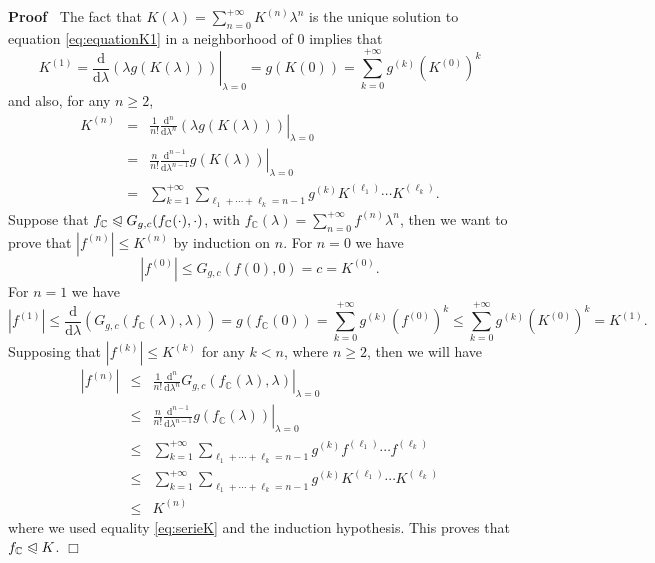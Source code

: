 \documentclass{article}
\newcommand{\mathd}{\mathrm{d}}
\newenvironment{proof}{\noindent\textbf{Proof\ }}{\hspace*{\fill}$\Box$\medskip}
\begin{document}
\begin{proof}
  The fact that $K (\lambda) = \sum_{n = 0}^{+ \infty} K^{(n)} \lambda^n$ is
  the unique solution to equation {\eqref{eq:equationK1}} in a neighborhood of
  $0$ implies that
  \[ K^{(1)} = \left. \left. \frac{\mathd}{\mathd \lambda} (\lambda g (K
     (\lambda))) \right| \right._{\lambda = 0} = g (K (0)) = \sum_{k = 0}^{+
     \infty} g^{(k)} (K^{(0)})^k \]
  and also, for any $n \geqslant 2$,
  \begin{eqnarray}
    K^{(n)} & = & \frac{1}{n!} \left. \left. \frac{\mathd^n}{\mathd \lambda^n}
    (\lambda g (K (\lambda))) \right| \right._{\lambda = 0} \nonumber\\
    & = & \frac{n}{n!} \left. \left. \frac{\mathd^{n - 1}}{\mathd \lambda^{n
    - 1}} g (K (\lambda)) \right| \right._{\lambda = 0} \nonumber\\
    & = & \sum_{k = 1}^{+ \infty} \sum_{\ell_1 + \cdots + \ell_k = n - 1}
    g^{(k)} K^{(\ell_1)} \cdots K^{(\ell_k)} .  \label{eq:serieK}
  \end{eqnarray}
  Suppose that $f_{\mathbb{C}} \trianglelefteqslant G_{g, c} (f_{\mathbb{C}}
  (\cdot), \cdot)$, with $f_{\mathbb{C}} (\lambda) = \sum_{n = 0}^{+ \infty}
  f^{(n)} \lambda^n$, then we want to prove that $| f^{(n)} | \leqslant
  K^{(n)}$ by induction on $n$. For $n = 0$ we have
  \[ | f^{(0)} | \leqslant G_{g, c} (f (0), 0) = c = K^{(0)} . \]
  For $n = 1$ we have
  \[ | f^{(1)} | \leqslant \frac{\mathd}{\mathd \lambda} (G_{g, c}
     (f_{\mathbb{C}} (\lambda), \lambda)) = g (f_{\mathbb{C}} (0)) = \sum_{k =
     0}^{+ \infty} g^{(k)} (f^{(0)})^k \leqslant \sum_{k = 0}^{+ \infty}
     g^{(k)} (K^{(0)})^k = K^{(1)} . \]
  Supposing that $| f^{(k)} | \leqslant K^{(k)}$ for any $k < n$, where $n
  \geqslant 2$, then we will have
  \begin{eqnarray}
    | f^{(n)} | & \leqslant & \frac{1}{n!} \left. \frac{\mathd^n}{\mathd
    \lambda^n} G_{g, c} (f_{\mathbb{C}} (\lambda), \lambda) \right|_{\lambda =
    0} \nonumber\\
    & \leqslant & \frac{n}{n!} \left. \frac{\mathd^{n - 1}}{\mathd \lambda^{n
    - 1}} g (f_{\mathbb{C}} (\lambda)) \right|_{\lambda = 0} \nonumber\\
    & \leqslant & \sum_{k = 1}^{+ \infty} \sum_{\ell_1 + \cdots + \ell_k = n
    - 1} g^{(k)} f^{(\ell_1)} \cdots f^{(\ell_k)} \nonumber\\
    & \leqslant & \sum_{k = 1}^{+ \infty} \sum_{\ell_1 + \cdots + \ell_k = n
    - 1} g^{(k)} K^{(\ell_1)} \cdots K^{(\ell_k)} \nonumber\\
    & \leqslant & K^{(n)} \nonumber
  \end{eqnarray}
  where we used equality {\eqref{eq:serieK}} and the induction hypothesis.
  This proves that $f_{\mathbb{C}} \trianglelefteqslant K$.
\end{proof}
\end{document}
